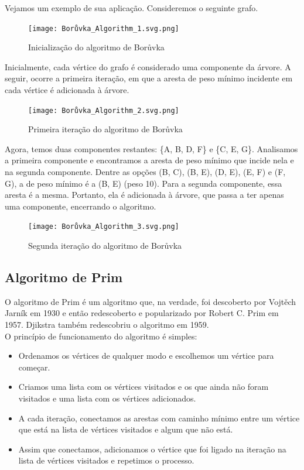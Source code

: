 \documentclass{article}
\begin{document}
Vejamos um exemplo de sua aplicação. Consideremos o seguinte grafo.

\begin{figure}[h]
\centering
\texttt{[image: Borůvka\_Algorithm\_1.svg.png]}
\caption{Inicialização do algoritmo de Borůvka}
\label{fig:enter-label}
\end{figure}

\vspace{4cm}

Inicialmente, cada vértice do grafo é considerado uma componente da árvore. A seguir, ocorre a primeira iteração, em que a aresta de peso mínimo incidente em cada vértice é adicionada à árvore.

\begin{figure}[h!]
\centering
\texttt{[image: Borůvka\_Algorithm\_2.svg.png]}
\caption{Primeira iteração do algoritmo de Borůvka}
\label{fig:enter-label}
\end{figure}

Agora, temos duas componentes restantes: \{A, B, D, F\} e \{C, E, G\}. Analisamos a primeira componente e encontramos a aresta de peso mínimo que incide nela e na segunda componente. Dentre as opções (B, C), (B, E), (D, E), (E, F) e (F, G), a de peso mínimo é a (B, E) (peso 10). Para a segunda componente, essa aresta é a mesma. Portanto, ela é adicionada à árvore, que passa a ter apenas uma componente, encerrando o algoritmo.

\begin{figure}[h!]
\centering
\texttt{[image: Borůvka\_Algorithm\_3.svg.png]}
\caption{Segunda iteração do algoritmo de Borůvka}
\label{fig:enter-label}
\end{figure}

\subsection{Algoritmo de Prim}
O algoritmo de Prim é um algoritmo que, na verdade, foi descoberto por Vojtěch Jarník em 1930 e então redescoberto e popularizado por Robert C. Prim em 1957. Djikstra também redescobriu o algoritmo em 1959.\\ 

O princípio de funcionamento do algoritmo é simples:
\begin{itemize}
    \item Ordenamos os vértices de qualquer modo e escolhemos um vértice para começar.
    \item Criamos uma lista com os vértices visitados e os que ainda não foram visitados e uma lista com os vértices adicionados.
    \item A cada iteração, conectamos as arestas com caminho mínimo entre um vértice que está na lista de vértices visitados e algum que não está.
    \item Assim que conectamos, adicionamos o vértice que foi ligado na iteração na lista de vértices visitados e repetimos o processo.
\end{itemize}
\end{document}
